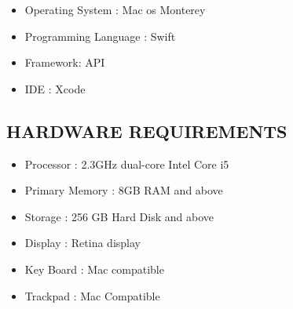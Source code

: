 \documentclass[12pt]{article}
\begin{document}
\begin{itemize}
\item Operating System             \hspace{21.5mm}: \hspace{19mm}   Mac os Monterey
\item Programming Language               \hspace{10.5mm}: \hspace{20mm}   Swift 
\item Framework\hspace{35mm}: \hspace{19mm}  API
 \item IDE                      \hspace{46mm}: \hspace{20mm} Xcode
\end{itemize}
\vspace{10px}
       
\subsection{HARDWARE REQUIREMENTS}

\begin{itemize}
\item Processor      \hspace{23mm}: \hspace{20mm}    2.3GHz dual-core Intel Core i5
\item Primary Memory    \hspace{9mm}: \hspace{20mm}  8GB RAM and above                
\item Storage    \hspace{26.5mm}: \hspace{20mm}    256 GB Hard Disk and above
 \item Display     \hspace{26.5mm}: \hspace{20mm}   Retina display 
\item Key Board  \hspace{20.5mm}: \hspace{20mm}           Mac compatible 
\item Trackpad        \hspace{23mm}: \hspace{21.5mm}Mac Compatible 
\end{itemize}
\vspace{10px}
\end{document}

